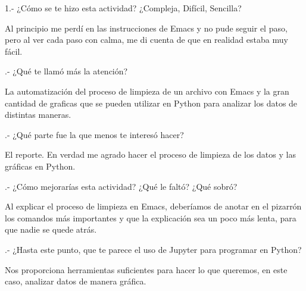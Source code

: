 \documentclass{article}
\begin{document}
    1.- ¿Cómo se te hizo esta actividad? ¿Compleja, Difícil, Sencilla?
    
    \vspace{0.3cm}
	Al principio me perdí en las instrucciones de Emacs y no pude seguir el paso, pero al ver cada paso con calma, me di cuenta de que en realidad estaba muy fácil.
    \vspace{0.3cm}
    
.- ¿Qué te llamó más la atención?
    
    \vspace{0.3cm}
	La automatización del proceso de limpieza de un archivo con Emacs y la gran cantidad de graficas que se pueden utilizar en Python para analizar los datos de distintas maneras.
    \vspace{0.3cm}
    
.- ¿Qué parte fue la que menos te interesó hacer?
    
    \vspace{0.3cm}
	El reporte. En verdad me agrado hacer el proceso de limpieza de los datos y las gráficas en Python.
    \vspace{0.3cm}
    
.- ¿Cómo mejorarías esta actividad? ¿Qué le faltó? ¿Qué sobró?
    
    \vspace{0.3cm}
	Al explicar el proceso de limpieza en Emacs, deberíamos de anotar en el pizarrón los comandos más importantes y que la explicación sea un poco más lenta, para que nadie se quede atrás.
    \vspace{0.3cm}
    
.- ¿Hasta este punto, que te parece el uso de Jupyter para programar en Python? 
    
    \vspace{0.3cm}
	Nos proporciona herramientas suficientes para hacer lo que queremos, en este caso, analizar datos de manera gráfica.
    \vspace{0.3cm}
\end{document}
